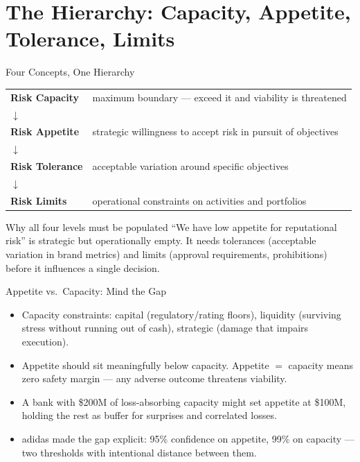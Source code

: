 \documentclass[11pt, aspectratio=169]{beamer}
\begin{document}
\section{The Hierarchy: Capacity, Appetite, Tolerance, Limits}

\begin{frame}{Four Concepts, One Hierarchy}
\begin{center}
\begin{tabular}{ll}
\textbf{Risk Capacity} & maximum boundary --- exceed it and viability is threatened \\[2pt]
$\downarrow$ & \\[2pt]
\textbf{Risk Appetite} & strategic willingness to accept risk in pursuit of objectives \\[2pt]
$\downarrow$ & \\[2pt]
\textbf{Risk Tolerance} & acceptable variation around specific objectives \\[2pt]
$\downarrow$ & \\[2pt]
\textbf{Risk Limits} & operational constraints on activities and portfolios \\
\end{tabular}
\end{center}
\medskip
\begin{block}{Why all four levels must be populated}
``We have low appetite for reputational risk'' is strategic but operationally empty. It needs tolerances (acceptable variation in brand metrics) and limits (approval requirements, prohibitions) before it influences a single decision.
\end{block}
\end{frame}

\begin{frame}{Appetite vs.\ Capacity: Mind the Gap}
\begin{itemize}
  \item Capacity constraints: capital (regulatory/rating floors), liquidity (surviving stress without running out of cash), strategic (damage that impairs execution).
  \item \alert{Appetite should sit meaningfully below capacity.} Appetite $=$ capacity means zero safety margin --- any adverse outcome threatens viability.
  \item A bank with \$200M of loss-absorbing capacity might set appetite at \$100M, holding the rest as buffer for surprises and correlated losses.
  \item adidas made the gap explicit: 95\% confidence on appetite, 99\% on capacity --- two thresholds with intentional distance between them.
\end{itemize}
\end{frame}
\end{document}
